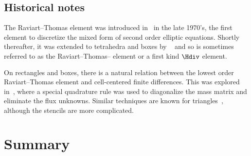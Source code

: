 \subsection{Historical notes}

The Raviart--Thomas element was introduced in~\cite{RaviartThomas1977}
in the late 1970's, the first element to discretize the mixed form of
second order elliptic equations. Shortly thereafter, it was extended
to tetrahedra and boxes by \nedelec{}~\cite{Nedelec1980} and so is
sometimes referred to as the Raviart--Thomas--\nedelec{} element or a
first kind $\Hdiv$ element.

On rectangles and boxes, there is a natural relation between the
lowest order Raviart--Thomas element and cell-centered finite
differences. This was explored in~\cite{RussellWheeler1983}, where a
special quadrature rule was used to diagonalize the mass matrix and
eliminate the flux unknowns. Similar techniques are known for
triangles~\cite{ArbogastDawsonEtAl1998}, although the stencils are
more complicated.

\newpage

\section{Summary}

